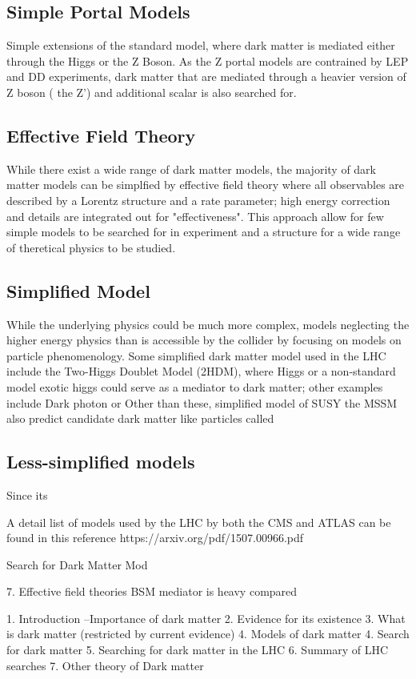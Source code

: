 \subsection{Simple Portal Models}
Simple extensions of the standard model, where dark matter is mediated either through the Higgs or the Z Boson. As the Z portal models are contrained by LEP and DD experiments, dark matter that are mediated through a heavier version of Z boson ( the Z') and additional scalar is also searched for. 

\subsection{Effective Field Theory}
While there exist a wide range of dark matter models, the majority of dark matter models can be simplfied by effective field theory where all observables are described by a Lorentz structure and a rate parameter; high energy correction and details are integrated out for "effectiveness". 
This approach allow for few simple models to be searched for in experiment and a structure for a wide range of theretical physics to be studied. 

\subsection{Simplified Model}
While the underlying physics could be much more complex, models neglecting the higher energy physics than is accessible by the collider by focusing on models on particle phenomenology. 
Some simplified dark matter model used in the LHC include the Two-Higgs Doublet Model (2HDM), where Higgs or a non-standard model exotic higgs could serve as a mediator to dark matter; other examples include Dark photon or 
Other than these, simplified model of SUSY the MSSM also predict candidate dark matter like particles called 

\subsection{Less-simplified models}
Since its 

A detail list of models used by the LHC by both the CMS and ATLAS can be found in this reference https://arxiv.org/pdf/1507.00966.pdf


Search for Dark Matter Mod


7. 
Effective field theories
BSM mediator is heavy compared

1. Introduction --Importance of dark matter 
2. Evidence for its existence 
3. What is dark matter (restricted by current evidence) 
4. Models of dark matter
4. Search for dark matter 
5. Searching for dark matter in the LHC 
6. Summary of LHC searches
7. Other theory of Dark matter


